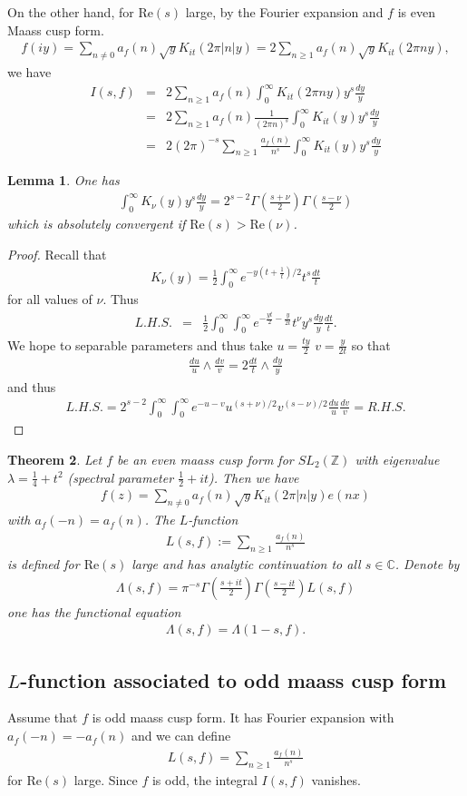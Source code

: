 \documentclass[11pt,reqno]{amsart}
\newcommand{\bna}{\begin{eqnarray*}}
\newcommand{\ena}{\end{eqnarray*}}
\def\re{{\mathrm{Re}}}
\def\C{\mathbb{C}}
\def\Z{\mathbb{Z}}
\newtheorem{lemma}{Lemma}[section]
\newtheorem{thm}[lemma]{Theorem}
\theoremstyle{definition}
\begin{document}
On the other hand,  for $\re(s)$ large,
by the Fourier expansion and $f$ is even Maass cusp form.
\bna
f(iy)=\sum_{n\neq 0}a_f(n)\sqrt{y}K_{it}(2\pi |n|y)
=2\sum_{n\geq  1}a_f(n)\sqrt{y}K_{it}(2\pi ny),
\ena
we have
\bna
I(s,f)&=&2\sum_{n\geq 1}a_f(n)
\int_0^\infty K_{it}(2\pi ny)  y^{s}\frac{dy}{y}\\
&=&2\sum_{n\geq 1}a_f(n)\frac{1}{(2\pi n)^{s}}
\int_0^\infty K_{it}(y)  y^{s}\frac{dy}{y}\\
&=&2(2\pi)^{-s}\sum_{n\geq 1}\frac{a_f(n)}{n^s}\int_0^\infty K_{it}(y)y^s\frac{dy}{y}
\ena
\begin{lemma}
One has
\bna
\int_0^\infty K_{\nu}(y)y^s\frac{dy}{y}=2^{s-2}\Gamma\left(\frac{s+\nu}{2}\right)\Gamma\left(\frac{s-\nu}{2}\right)
\ena
which is absolutely convergent if $\re(s)>\re(\nu)$.
\end{lemma}
\begin{proof}
Recall that
\bna
K_{\nu}(y)=\frac{1}{2}\int_0^\infty e^{-y(t+\frac{1}{t})/2}t^s\frac{dt}{t}
\ena
for all values of $\nu$. Thus
\bna
L.H.S.&=&\frac{1}{2}\int_0^\infty\int_0^\infty e^{-\frac{yt}{2}-\frac{y}{2t}}t^{\nu} y^s\frac{dy}{y}\frac{dt}{t}.
\ena
We hope to separable parameters and thus take $u=\frac{ty}{2}$ $v=\frac{y}{2t}$ so that
\bna
\frac{du}{u}\wedge \frac{dv}{v}=2\frac{dt}{t}\wedge \frac{dy}{y}
\ena
and thus
\bna
L.H.S.=2^{s-2}\int_0^\infty\int_0^\infty e^{-u-v}u^{(s+\nu)/2} v^{(s-\nu)/2}\frac{du}{u}\frac{dv}{v}
=R.H.S.
\ena
\end{proof}
\begin{thm}
Let $f$ be an even maass cusp form  for $SL_2(\Z)$
with eigenvalue $\lambda=\frac{1}{4}+t^2$ (spectral parameter $\frac{1}{2}+it$).
Then we have
\bna
f(z)=\sum_{n\neq 0}a_f(n)\sqrt{y}K_{it}(2\pi|n|y)e(nx)
\ena
with $a_f(-n)=a_f(n)$.
The $L$-function
\bna
L(s,f):=\sum_{n\geq 1}\frac{a_f(n)}{n^s}
\ena
is defined for $\re(s)$ large and has analytic continuation to all $s\in\C$.
Denote by
\bna
\Lambda(s,f)=\pi^{-s}\Gamma(\frac{s+it}{2})\Gamma(\frac{s-it}{2})L(s,f)
\ena
one has the functional equation
\bna
\Lambda(s,f)=\Lambda(1-s,f).
\ena
\end{thm}
\subsection{$L$-function associated to odd maass cusp form}

Assume that $f$ is odd maass cusp form.
It has Fourier expansion with $a_f(-n)=-a_f(n)$ and we can define
\bna
L(s,f)=\sum_{n\geq 1}\frac{a_f(n)}{n^s}
\ena
for $\re(s)$ large.
Since $f$ is odd, the integral $I(s,f)$ vanishes.
\end{document}
